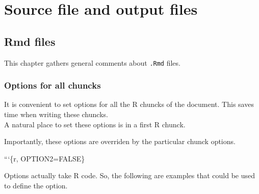\documentclass[]{book}
\newenvironment{Shaded}{}{}
\newcommand{\BaseNTok}[1]{\textcolor[rgb]{0.25,0.63,0.44}{#1}}
\newcommand{\DataTypeTok}[1]{\textcolor[rgb]{0.56,0.13,0.00}{#1}}
\newcommand{\KeywordTok}[1]{\textcolor[rgb]{0.00,0.44,0.13}{\textbf{#1}}}
\newcommand{\NormalTok}[1]{#1}
\newcommand{\OperatorTok}[1]{\textcolor[rgb]{0.40,0.40,0.40}{#1}}
\newcommand{\OtherTok}[1]{\textcolor[rgb]{0.00,0.44,0.13}{#1}}
\theoremstyle{definition}
\theoremstyle{definition}
\theoremstyle{definition}
\theoremstyle{remark}
\begin{document}
\hypertarget{part-source-file-and-output-files}{%
\part{Source file and output
files}\label{part-source-file-and-output-files}}

\hypertarget{rmd}{%
\chapter{Rmd files}\label{rmd}}

This chapter gathers general comments about \texttt{.Rmd} files.

\hypertarget{options-for-all-chuncks}{%
\section{Options for all chuncks}\label{options-for-all-chuncks}}

It is convenient to set options for all the R chuncks of the document.
This saves time when writing these chuncks.\\
A natural place to set these options is in a first R chunck.

\begin{Shaded}
\end{Shaded}

Importantly, these options are overriden by the particular chunck
options.

\begin{Shaded}
\begin{Highlighting}[]
\BaseNTok{```\{r, OPTION2=FALSE\}}
\end{Highlighting}
\end{Shaded}

Options actually take R code. So, the following are examples that could
be used to define the option.

\begin{Shaded}
\end{Shaded}
\end{document}
